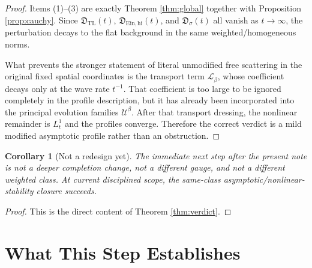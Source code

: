 \documentclass[11pt]{article}
\newcommand{\Ell}{\mathcal{L}}
\newtheorem{corollary}{Corollary}
\begin{document}
\begin{proof}
Items (1)--(3) are exactly Theorem \ref{thm:global} together with Proposition \ref{prop:cauchy}. Since \(\mathfrak D_{\mathrm{TL}}(t)\), \(\mathfrak D_{\mathrm{Ein,hi}}(t)\), and \(\mathfrak D_\sigma(t)\) all vanish as \(t\to\infty\), the perturbation decays to the flat background in the same weighted/homogeneous norms.

What prevents the stronger statement of literal unmodified free scattering in the original fixed spatial coordinates is the transport term \(\Ell_\beta\), whose coefficient decays only at the wave rate \(t^{-1}\). That coefficient is too large to be ignored completely in the profile description, but it has already been incorporated into the principal evolution families \(\mathcal U^\beta\). After that transport dressing, the nonlinear remainder is \(L_t^1\) and the profiles converge. Therefore the correct verdict is a mild modified asymptotic profile rather than an obstruction.
\end{proof}

\begin{corollary}[Not a redesign yet]
\label{cor:notredesign}
The immediate next step after the present note is not a deeper completion change, not a different gauge, and not a different weighted class. At current disciplined scope, the same-class asymptotic/nonlinear-stability closure succeeds.
\end{corollary}

\begin{proof}
This is the direct content of Theorem \ref{thm:verdict}.
\end{proof}

\section{What This Step Establishes}
\end{document}
